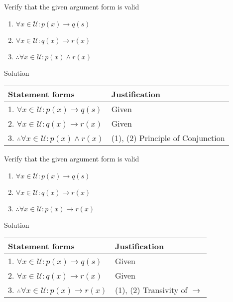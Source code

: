 \newpage
\begin{longfbox}
    \begin{bt} \label{pro:practice2.35}
        Verify that the given argument form is valid
        \begin{enumerate}
            \item[] $\forall x \in \mathcal U: p(x) \rightarrow q(s)$
            \item[] $\forall x \in \mathcal U: q(x) \rightarrow r(x)$
            \item[] $\therefore \forall x \in \mathcal U: p(x) \land r(x)$
        \end{enumerate}
    \end{bt}
\end{longfbox}

Solution
\begin{table}[hbt!]
    \centering
    \begin{tabular}{|l | l|}
    \hline
    Statement forms & Justification\\ [0.5ex]
    \hline
        1. $\forall x \in \mathcal U: p(x) \rightarrow q(s)$ & Given \\
        2. $\forall x \in \mathcal U: q(x) \rightarrow r(x)$ & Given \\
        3. $\therefore \forall x \in \mathcal U: p(x) \land r(x)$ & (1), (2) Principle of Conjunction \\
    \hline
    \end{tabular}
\end{table}

\begin{longfbox}
    \begin{bt} \label{pro:practice2.36}
        Verify that the given argument form is valid
        \begin{enumerate}
            \item[] $\forall x \in \mathcal U: p(x) \rightarrow q(s)$
            \item[] $\forall x \in \mathcal U: q(x) \rightarrow r(x)$
            \item[] $\therefore \forall x \in \mathcal U: p(x) \rightarrow r(x)$
        \end{enumerate}
    \end{bt}
\end{longfbox}

Solution
\begin{table}[hbt!]
    \centering
    \begin{tabular}{|l | l|}
    \hline
    Statement forms & Justification\\ [0.5ex]
    \hline
        1. $\forall x \in \mathcal U: p(x) \rightarrow q(s)$ & Given \\
        2. $\forall x \in \mathcal U: q(x) \rightarrow r(x)$ & Given \\
        3. $\therefore \forall x \in \mathcal U: p(x) \rightarrow r(x)$ & (1), (2) Transivity of $\rightarrow$ \\
    \hline
    \end{tabular}
\end{table}

